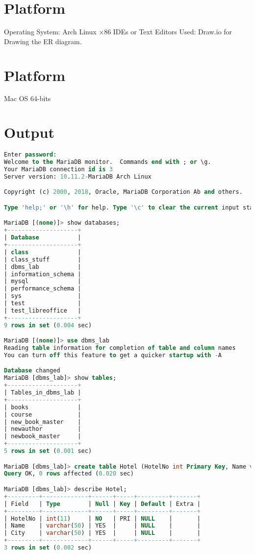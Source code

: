 \documentclass{article}
\begin{document}
\section{\textbf{Platform}}
Operating System: Arch Linux ×86
IDEs or Text Editors Used: Draw.io for Drawing the ER diagram.
\section{\textbf{Platform}}
Mac OS 64-bits
\section{\textbf{Output}}
\begin{lstlisting}[language=SQL]
Enter password:
Welcome to the MariaDB monitor.  Commands end with ; or \g.
Your MariaDB connection id is 3
Server version: 10.11.2-MariaDB Arch Linux

Copyright (c) 2000, 2018, Oracle, MariaDB Corporation Ab and others.

Type 'help;' or '\h' for help. Type '\c' to clear the current input statement.

MariaDB [(none)]> show databases;
+--------------------+
| Database           |
+--------------------+
| class              |
| class_stuff        |
| dbms_lab           |
| information_schema |
| mysql              |
| performance_schema |
| sys                |
| test               |
| test_libreoffice   |
+--------------------+
9 rows in set (0.004 sec)

MariaDB [(none)]> use dbms_lab
Reading table information for completion of table and column names
You can turn off this feature to get a quicker startup with -A

Database changed
MariaDB [dbms_lab]> show tables;
+--------------------+
| Tables_in_dbms_lab |
+--------------------+
| books              |
| course             |
| new_book_master    |
| newauthor          |
| newbook_master     |
+--------------------+
5 rows in set (0.001 sec)

MariaDB [dbms_lab]> create table Hotel (HotelNo int Primary Key, Name varchar(50), City varchar(50));
Query OK, 0 rows affected (0.020 sec)

MariaDB [dbms_lab]> describe Hotel;
+---------+-------------+------+-----+---------+-------+
| Field   | Type        | Null | Key | Default | Extra |
+---------+-------------+------+-----+---------+-------+
| HotelNo | int(11)     | NO   | PRI | NULL    |       |
| Name    | varchar(50) | YES  |     | NULL    |       |
| City    | varchar(50) | YES  |     | NULL    |       |
+---------+-------------+------+-----+---------+-------+
3 rows in set (0.002 sec)


\end{lstlisting}
\end{document}

